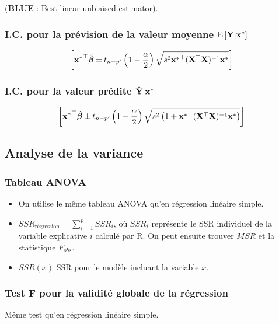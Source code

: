 \documentclass[10pt, french]{article}
\begin{document}
\begin{multicols*}{3}
(\textbf{BLUE} : Best linear unbiaised estimator).

\subsubsection*{I.C. pour la prévision de la valeur moyenne $\mathrm{E} \left[ \mathbf{Y} | \mathbf{x^*} \right]$}
\begin{align*}
\left[ \mathbf{{x^*}^\top} \hat{\bm{\beta}} \pm t_{n-p'}\left(1 - \frac{\alpha}{2} \right) \sqrt{s^2 \mathbf{{x^*}^\top} (\mathbf{X}^\top \mathbf{X})^{-1}\mathbf{x^*}} \right]
\end{align*}

\subsubsection*{I.C. pour la valeur prédite $\hat{\mathbf{Y}}|\mathbf{x^*}$}
\begin{align*}
\left[ \mathbf{{x^*}^\top} \hat{\bm{\beta}} \pm t_{n-p'}\left(1 - \frac{\alpha}{2} \right) \sqrt{s^2\left( 1 +  \mathbf{{x^*}^\top} (\mathbf{X}^\top \mathbf{X})^{-1}\mathbf{x^*}\right)} \right]
\end{align*}


\subsection*{Analyse de la variance}
\subsubsection*{Tableau ANOVA}
\begin{itemize}
\item On utilise le même tableau ANOVA qu'en régression linéaire simple.
\item $SSR_{\text{régression}} = \sum_{i=1}^{p} SSR_i $, où $SSR_i$ représente le SSR individuel de la variable explicative $i$ calculé par R. On peut ensuite trouver $MSR$ et la statistique $F_{obs}$.
\item $SSR(x)$ SSR pour le modèle incluant la variable $x$.
\end{itemize}

\subsubsection*{Test F pour la validité globale de la régression}
Même test qu'en régression linéaire simple.



\end{multicols*}
\end{document}
